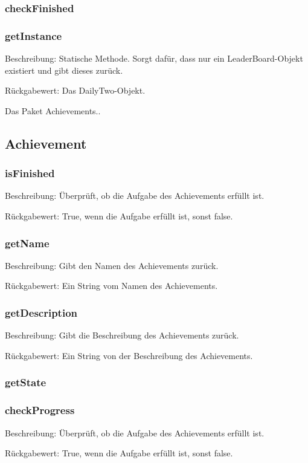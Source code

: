 \documentclass[a4paper]{scrreprt}
\begin{document}
   \subsubsection{checkFinished}
   \subsubsection{getInstance}
   \item Beschreibung: Statische Methode. Sorgt dafür, dass nur ein LeaderBoard-Objekt existiert und gibt dieses zurück.
   \item Rückgabewert: Das DailyTwo-Objekt.
   
   Das Paket Achievements..
   
   \subsection{Achievement}
   \subsubsection{isFinished}
   \item Beschreibung: Überprüft, ob die Aufgabe des Achievements erfüllt ist.
   \item Rückgabewert: True, wenn die Aufgabe erfüllt ist, sonst false.
   \subsubsection{getName}
   \item Beschreibung: Gibt den Namen des Achievements zurück.
   \item Rückgabewert: Ein String vom Namen des Achievements.
   \subsubsection{getDescription}
   \item Beschreibung: Gibt die Beschreibung des Achievements zurück.
   \item Rückgabewert: Ein String von der Beschreibung des Achievements.
   \subsubsection{getState}
   \subsubsection{checkProgress}
   \item Beschreibung: Überprüft, ob die Aufgabe des Achievements erfüllt ist.
   \item Rückgabewert: True, wenn die Aufgabe erfüllt ist, sonst false.
   
\end{document}
